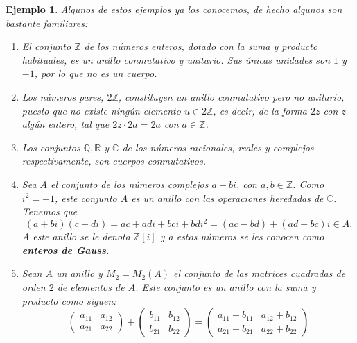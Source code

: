 \documentclass[12pt]{article}
\newtheorem{example}{Ejemplo}[theorem]
\begin{document}
\begin{example}\label{eq:ejemploAnillos} Algunos de estos ejemplos ya los conocemos, de hecho algunos son bastante familiares: \begin{enumerate}
\item El conjunto $\mathbb{Z}$ de los números enteros, dotado con la suma y producto habituales, es un anillo conmutativo y unitario. Sus únicas unidades son $1$ y $-1$, por lo que no es un cuerpo.
\item Los números pares, $2\mathbb{Z}$, constituyen un anillo conmutativo pero no unitario, puesto que no existe ningún elemento $u \in 2\mathbb{Z}$, es decir, de la forma $2z$ con $z$ algún entero, tal que $2z \cdot 2a = 2a$ con $a \in \mathbb{Z}$.
\item Los conjuntos $\mathbb{Q}, \mathbb{R}$ y $\mathbb{C}$ de los números racionales, reales y complejos respectivamente, son cuerpos conmutativos.
\item Sea $A$ el conjunto de los números complejos $a +bi$, con $a,b \in \mathbb{Z}$. Como $i^{2} = -1$, este conjunto $A$ es un anillo con las operaciones heredadas de $\mathbb{C}$. Tenemos que $$(a+bi)(c+di) = ac + adi + bci + bdi^{2} = (ac-bd) + (ad+bc)i \in A.$$ A este anillo se le denota $\mathbb{Z}[i]$ y a estos números se les conocen como \textbf{enteros de Gauss}.
\item Sean $A$ un anillo y $M_{2} = M_{2}(A)$ el conjunto de las matrices cuadradas de orden $2$ de elementos de $A$. Este conjunto es un anillo con la suma y producto como siguen:  $$\left(
\begin{matrix}
a_{11} & a_{12} \\
a_{21} & a_{22}
\end{matrix}
\right) + \left(
\begin{matrix}
b_{11} & b_{12} \\
b_{21} & b_{22}
\end{matrix}
\right) = \left(
\begin{matrix}
a_{11} + b_{11} & a_{12} + b_{12}\\
a_{21} +b_{21} & a_{22} + b_{22}
\end{matrix}
\right)$$ 


\end{enumerate}
\end{example}
\end{document}
